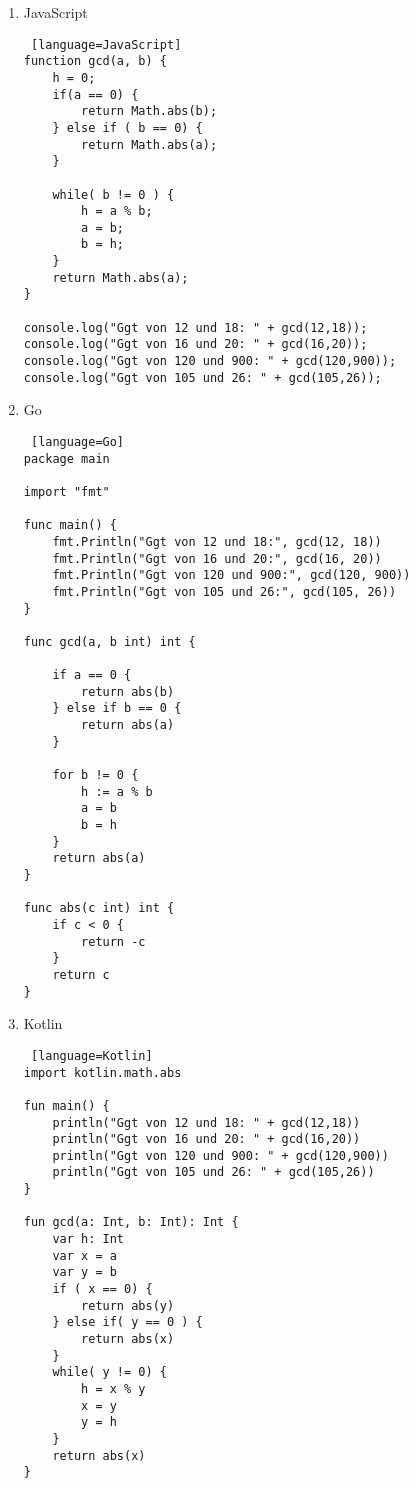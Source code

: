 \documentclass[a4paper,11pt]{scrartcl}
\begin{document}
\begin{enumerate}
\begin{lstlisting} [language=Python]
    return abs(a)

print("Ggt von 12 und 18: " + str(gcd(12,18)))
print("Ggt von 16 und 20: " + str(gcd(16,20)))
print("Ggt von 120 und 900: " + str(gcd(120,900)))
print("Ggt von 105 und 26: " + str(gcd(105,26)))
\end{lstlisting}
            \item JavaScript
\begin{lstlisting} [language=JavaScript]
function gcd(a, b) {
    h = 0;
    if(a == 0) {
        return Math.abs(b);
    } else if ( b == 0) {
        return Math.abs(a);
    }

    while( b != 0 ) {
        h = a % b;
        a = b;
        b = h;
    }
    return Math.abs(a);
}

console.log("Ggt von 12 und 18: " + gcd(12,18));
console.log("Ggt von 16 und 20: " + gcd(16,20));
console.log("Ggt von 120 und 900: " + gcd(120,900));
console.log("Ggt von 105 und 26: " + gcd(105,26));
\end{lstlisting}
            \item Go
\begin{lstlisting} [language=Go]
package main

import "fmt"

func main() {
	fmt.Println("Ggt von 12 und 18:", gcd(12, 18))
	fmt.Println("Ggt von 16 und 20:", gcd(16, 20))
	fmt.Println("Ggt von 120 und 900:", gcd(120, 900))
	fmt.Println("Ggt von 105 und 26:", gcd(105, 26))
}

func gcd(a, b int) int {

	if a == 0 {
		return abs(b)
	} else if b == 0 {
		return abs(a)
	}

	for b != 0 {
		h := a % b
		a = b
		b = h
	}
	return abs(a)
}

func abs(c int) int {
	if c < 0 {
		return -c
	}
	return c
}
\end{lstlisting}
            \item Kotlin
\begin{lstlisting} [language=Kotlin]
import kotlin.math.abs

fun main() {
    println("Ggt von 12 und 18: " + gcd(12,18))
    println("Ggt von 16 und 20: " + gcd(16,20))
    println("Ggt von 120 und 900: " + gcd(120,900))
    println("Ggt von 105 und 26: " + gcd(105,26))
}

fun gcd(a: Int, b: Int): Int {
    var h: Int
    var x = a
    var y = b
    if ( x == 0) {
        return abs(y)
    } else if( y == 0 ) {
        return abs(x)
    }
    while( y != 0) {
        h = x % y
        x = y
        y = h
    }
    return abs(x)
}
\end{lstlisting}
        \end{enumerate}
    
\end{document}
